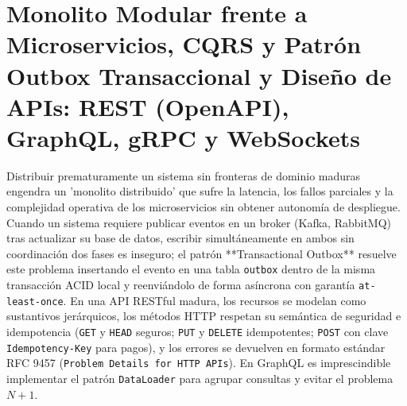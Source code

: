 \documentclass{book}
\begin{document}
\section{Monolito Modular frente a Microservicios, CQRS y Patrón Outbox Transaccional y Diseño de APIs: REST (OpenAPI), GraphQL, gRPC y WebSockets}

Distribuir prematuramente un sistema sin fronteras de dominio maduras engendra un 'monolito distribuido' que sufre la latencia, los fallos parciales y la complejidad operativa de los microservicios sin obtener autonomía de despliegue. Cuando un sistema requiere publicar eventos en un broker (Kafka, RabbitMQ) tras actualizar su base de datos, escribir simultáneamente en ambos sin coordinación dos fases es inseguro; el patrón **Transactional Outbox** resuelve este problema insertando el evento en una tabla \texttt{outbox} dentro de la misma transacción ACID local y reenviándolo de forma asíncrona con garantía \texttt{at-least-once}.
En una API RESTful madura, los recursos se modelan como sustantivos jerárquicos, los métodos HTTP respetan su semántica de seguridad e idempotencia (\texttt{GET} y \texttt{HEAD} seguros; \texttt{PUT} y \texttt{DELETE} idempotentes; \texttt{POST} con clave \texttt{Idempotency-Key} para pagos), y los errores se devuelven en formato estándar RFC 9457 (\texttt{Problem Details for HTTP APIs}). En GraphQL es imprescindible implementar el patrón \texttt{DataLoader} para agrupar consultas y evitar el problema \(N+1\).
\end{document}
